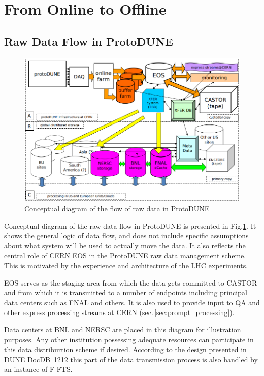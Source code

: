 \documentclass[pdftex,12pt,letter]{article}
\newcommand{\pd}{ProtoDUNE\xspace}
\begin{document}
\section{From Online to Offline}

\subsection{Raw Data Flow in \pd}
\label{sec:raw_concept}
\begin{figure}[tbh]
\centering\includegraphics[width=\linewidth]{protoDUNE_raw_data_concept.png}
\caption{\label{fig:raw_concept}Conceptual diagram of the flow of raw data in \pd}
\end{figure}

\noindent
Conceptual diagram of the raw data flow in \pd is presented in Fig.\ref{fig:raw_concept}. It shows the general logic
of data flow, and does not include specific assumptions about what system will be used to actually move the data.
It also reflects the central role of CERN EOS in the \pd raw data management scheme. This is motivated by the experience
and architecture of the LHC experiments.

EOS serves as the staging area from which the data gets committed to CASTOR
and from which it is transmitted to a number of endpoints including principal data centers such as FNAL and others.
It is also used to provide input to QA and other express processing streams at CERN (sec.\,\ref{sec:prompt_processing}).

Data centers at BNL and NERSC are placed in this diagram for illustration purposes. Any other institution possessing adequate
resources can participate in this data distriburtion scheme if desired. According to the design presented in DUNE DocDB~1212
this part of the data transmission process is also handled by an instance of F-FTS.
\end{document}
